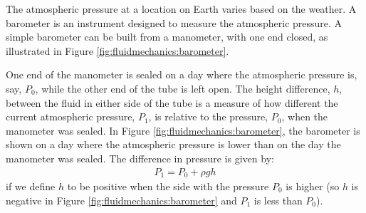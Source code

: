 {The atmospheric pressure at a location on Earth varies based on the weather. A barometer is an instrument designed to measure the atmospheric pressure. A simple barometer can be built from a manometer, with one end closed, as illustrated in Figure \ref{fig:fluidmechanics:barometer}.
{
One end of the manometer is sealed on a day where the atmospheric pressure is, say, $P_0$, while the other end of the tube is left open. The height difference, $h$, between the fluid in either side of the tube is a measure of how different the current atmospheric pressure, $P_1$, is relative to the pressure, $P_0$, when the manometer was sealed. In Figure \ref{fig:fluidmechanics:barometer}, the barometer is shown on a day where the atmospheric pressure is lower than on the day the manometer was sealed. The difference in pressure is given by:
\begin{align*}
P_1 = P_0 + \rho g h
\end{align*}
if we define $h$ to be positive when the side with the pressure $P_0$ is higher (so $h$ is negative in Figure \ref{fig:fluidmechanics:barometer} and $P_1$ is less than $P_0$).

}}
